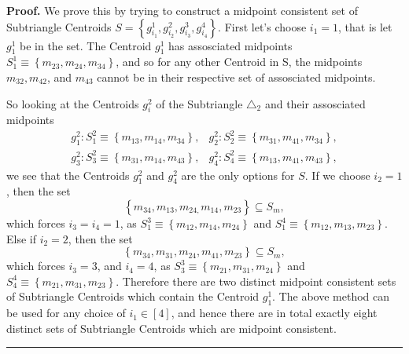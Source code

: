 \documentclass{unswthesis}
\newenvironment{proof}[1][Proof]{\noindent\textbf{#1.} }{\ \rule{0.5em}{0.5em}}
\begin{document}
\begin{proof}
We prove this by trying to construct a midpoint consistent set of
Subtriangle Centroids $S=\left\{
g_{i_{1}}^{1},g_{i_{2}}^{2},g_{i_{3}}^{3},g_{i_{4}}^{4}\right\} $. First
let's choose $i_{1}=1$, that is let $g_{1}^{1}$ be in the set. The Centroid $%
g_{1}^{1}$ has assosciated midpoints $S_{1}^{1}\equiv \left\{
m_{23},m_{24},m_{34}\right\} $, and so for any other Centroid in S, the
midpoints $m_{32},m_{42}$, and $m_{43}$ cannot be in their respective set of
assosciated midpoints.

So looking at the Centroids $g_{i}^{2}$ of the Subtriangle $\triangle _{2}$
and their assosciated midpoints%
\begin{equation*}
\begin{array}{cc}
g_{1}^{2}:S_{1}^{2}\equiv \left\{ m_{13},m_{14},m_{34}\right\} , & 
g_{2}^{2}:S_{2}^{2}\equiv \left\{ m_{31},m_{41},m_{34}\right\} , \\ 
g_{3}^{2}:S_{3}^{2}\equiv \left\{ m_{31},m_{14},m_{43}\right\} , & 
g_{4}^{2}:S_{4}^{2}\equiv \left\{ m_{13},m_{41},m_{43}\right\} ,%
\end{array}%
\end{equation*}%
we see that the Centroids $g_{1}^{2}$ and $g_{4}^{2}$ are the only options
for $S$. If we choose $i_{2}=1$, then the set 
\begin{equation*}
\left\{ m_{34},m_{13},m_{24,}m_{14},m_{23}\right\} \subseteq S_{m},
\end{equation*}%
which forces $i_{3}=i_{4}=1$, as $S_{1}^{3}\equiv \left\{
m_{12},m_{14},m_{24}\right\} $ and $S_{1}^{4}\equiv \left\{
m_{12},m_{13},m_{23}\right\} $. Else if $i_{2}=2$, then the set 
\begin{equation*}
\left\{ m_{34},m_{31},m_{24},m_{41},m_{23}\right\} \subseteq S_{m},
\end{equation*}%
which forces $i_{3}=3$, and $i_{4}=4$, as $S_{3}^{3}\equiv \left\{
m_{21},m_{31},m_{24}\right\} $ and $S_{4}^{4}\equiv \left\{
m_{21},m_{31},m_{23}\right\} $. Therefore there are two distinct midpoint
consistent sets of Subtriangle Centroids which contain the Centroid $%
g_{1}^{1}$. The above method can be used for any choice of $i_{1}\in \left[ 4%
\right] $, and hence there are in total exactly eight distinct sets of
Subtriangle Centroids which are midpoint consistent.
\end{proof}
\end{document}
